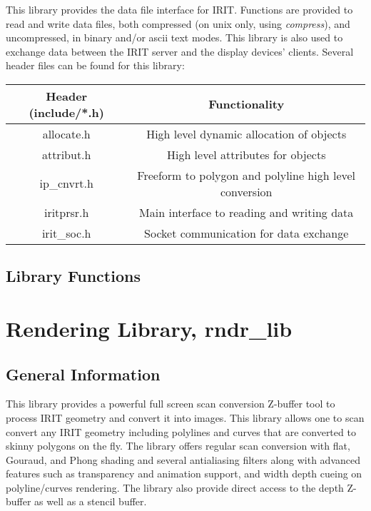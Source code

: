 {This library provides the data file interface for IRIT. Functions are
provided to read and write data files, both compressed (on unix only,
using {\em compress}), and uncompressed, in binary and/or ascii text
modes. This library is also used to exchange data between the IRIT
server and the display devices' clients.  Several header files can be
found for this library:
\begin{center}
\begin{tabular}{||c|c||} \hline
    Header (include/*.h) & Functionality \\ \hline
    allocate.h & High level dynamic allocation of objects \\
    attribut.h & High level attributes for objects \\
    ip\_cnvrt.h & Freeform to polygon and polyline high level conversion \\
    iritprsr.h & Main interface to reading and writing data \\
    irit\_soc.h & Socket communication for data exchange \\ \hline
\end{tabular}
\end{center}

\section{Library Functions}


\chapter{Rendering Library, rndr\_lib}

\section{General Information}

This library provides a powerful full screen scan conversion Z-buffer
tool to process IRIT geometry and convert it into images.  This
library allows one to scan convert any IRIT geometry including
polylines and curves that are converted to skinny polygons on the fly.
The library offers regular scan conversion with flat, Gouraud, and
Phong shading and several antialiasing filters along with advanced
features such as transparency and animation support, and width depth
cueing on polyline/curves rendering.  The library also provide direct
access to the depth Z-buffer as well as a stencil buffer.

}
